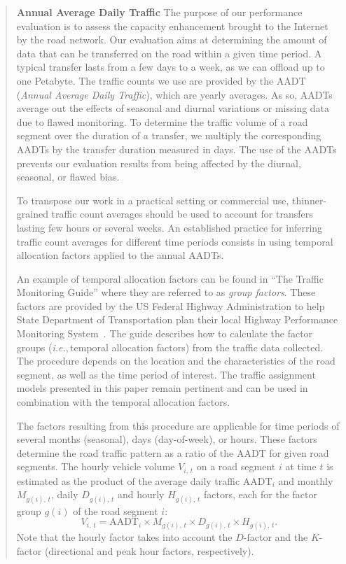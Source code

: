 \documentclass[11pt]{article}
\newcommand{\ie}{\textit{i.e.},\,}
\begin{document}
\begin{quote}
\noindent\textbf{Annual Average Daily Traffic}
The purpose of our performance evaluation is to assess the capacity enhancement brought to the Internet by the road network. Our evaluation aims at determining the amount of data that can be transferred on the road within a given time period. A typical transfer lasts from a few days to a week, as we can offload up to one Petabyte. The traffic counts we use are provided by the AADT (\textit{Annual Average Daily Traffic}), which are yearly averages. As so, AADTs average out the effects of seasonal and diurnal variations or missing data due to flawed monitoring. To determine the traffic volume of a road segment over the duration of a transfer, we multiply the corresponding AADTs by the transfer duration measured in days. The use of the AADTs prevents our evaluation results from being affected by the diurnal, seasonal, or flawed bias. 

To transpose our work in a practical setting or commercial use, thinner-grained traffic count averages should be used to account for transfers lasting few hours or several weeks. An established practice for inferring traffic count averages for different time periods consists in using temporal allocation factors applied to the annual AADTs. 

An example of temporal allocation factors can be found in ``The Traffic Monitoring Guide'' where they are referred to as \textit{group factors}. These factors are provided by the US Federal Highway Administration to help State Department of Transportation plan their local Highway Performance Monitoring System~\cite{wright1997variability,guide2013us}. The guide describes how to calculate the factor groups (\ie temporal allocation factors) from the traffic data collected. The procedure depends on the location and the characteristics of the road segment, as well as the time period of interest. The traffic assignment models presented in this paper remain pertinent and can be used in combination with the temporal allocation factors.

The factors resulting from this procedure are applicable for time periods of several months (seasonal), days (day-of-week), or hours. These factors determine the road traffic pattern as a ratio of the AADT for given road segments. The hourly vehicle volume $V_{i,\,t}$ on a road segment $i$ at time $t$ is estimated as the product of the average daily traffic $\textrm{AADT}_{i}$ and monthly $M_{g(i),\,t}$, daily $D_{g(i),\,t}$ and hourly $H_{g(i),\,t}$ factors, each for the factor group $g(i)$ of the road segment $i$:
\begin{equation}
    \label{eq:traffic-variation}
    V_{i,\,t} = \textrm{AADT}_{i} \times M_{g(i),\,t} \times D_{g(i),\,t} \times H_{g(i),\,t}.
\end{equation}
Note that the hourly factor takes into account the $D$-factor and the $K$-factor (directional and peak hour factors, respectively).


\end{quote}
\end{document}
